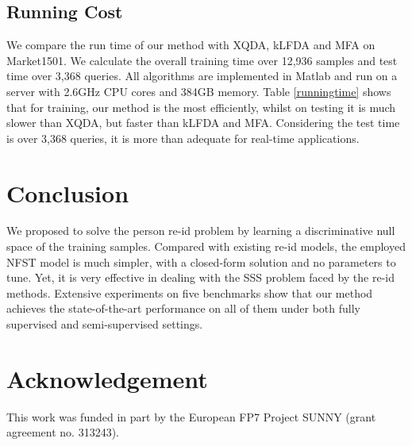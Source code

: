 \documentclass[10pt,twocolumn,letterpaper]{article}
\begin{document}
\subsection{Running Cost}

%

We compare the run time of our method with XQDA, kLFDA and MFA on  Market1501. We calculate the overall training time over 12,936 samples and test time over 3,368 queries. All algorithms are implemented in Matlab and run on a server with 2.6GHz CPU cores and 384GB memory. Table \ref{runningtime} shows that for training, our method is the most efficiently, whilst on testing it is much slower than XQDA, but faster than kLFDA and MFA. Considering the test time is over 3,368 queries, it is more than adequate for real-time applications.  


			\setlength{\tabcolsep}{3pt}
	\begin{table}[H]
		\centering
		\caption{Run time comparison on Market1501 (in seconds)}
		\label{runningtime}
	\end{table}


\section{Conclusion}
We proposed to solve the person re-id problem by learning a discriminative null space of the training samples. Compared with existing re-id models, the employed NFST model is much simpler, with a closed-form solution and no parameters to tune. Yet, it is very effective in dealing with the SSS problem faced by the re-id methods. Extensive experiments on five benchmarks show that our method achieves the state-of-the-art performance on all of them under both fully supervised and semi-supervised settings. 

\section*{Acknowledgement}
This work was funded in part by the European FP7 Project SUNNY (grant agreement no. 313243).

{\small


}
\end{document}
